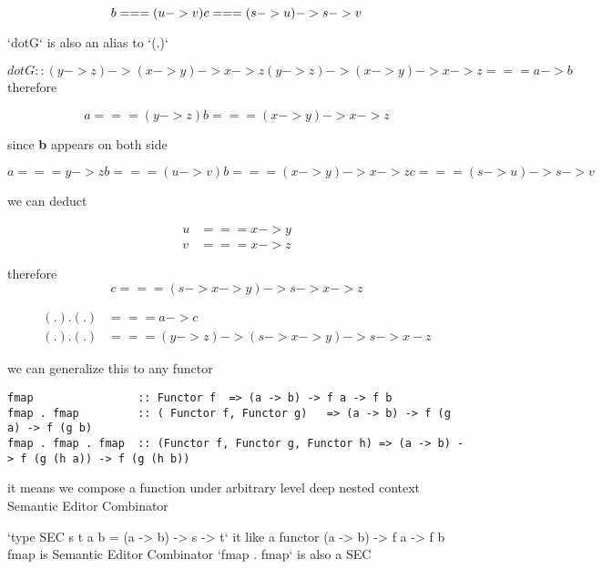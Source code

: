 \begin{equation}
b === (u -> v) \\
c === (s -> u) -> s -> v
\end{equation}

`dotG` is also an alias to `(.)`

\begin{equation}
dotG :: (y -> z) -> (x -> y) -> x -> z
(y -> z) -> (x -> y) -> x -> z === a -> b
\end{equation}
therefore

\begin{equation}
a === (y -> z)
b === (x -> y) -> x -> z
\end{equation}

since \textbf{b} appears on both side

\begin{equation}
a === y -> z
b === (u -> v)
b === (x -> y) -> x -> z
c === (s -> u) -> s -> v
\end{equation}

we can deduct

\begin{align*}
u &=== x -> y  \\
v &=== x -> z
\end{align*}

therefore \begin{equation}c === (s -> x -> y) -> s -> x -> z\end{equation}

\begin{align*}
(.).(.) & === a -> c \\
(.).(.) & === (y -> z) -> (s -> x -> y) -> s -> x - z
\end{align*}


we can generalize this to any functor

\begin{verbatim}
fmap                :: Functor f  => (a -> b) -> f a -> f b
fmap . fmap         :: ( Functor f, Functor g)   => (a -> b) -> f (g a) -> f (g b)
fmap . fmap . fmap  :: (Functor f, Functor g, Functor h) => (a -> b) -> f (g (h a)) -> f (g (h b))
\end{verbatim}

it means we compose a function under arbitrary level deep nested context
Semantic Editor Combinator

`type SEC s t a b = (a -> b) -> s -> t`
it like a functor (a -> b) -> f a -> f b
fmap is Semantic Editor Combinator
`fmap . fmap` is also a SEC

